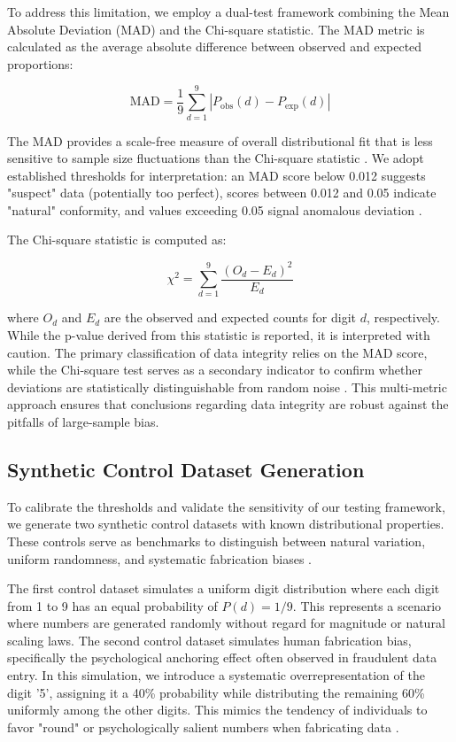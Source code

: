 \documentclass[11pt,a4paper]{article}
\begin{document}
To address this limitation, we employ a dual-test framework combining the Mean Absolute Deviation (MAD) and the Chi-square statistic. The MAD metric is calculated as the average absolute difference between observed and expected proportions:

$$ \text{MAD} = \frac{1}{9} \sum_{d=1}^{9} |P_{\text{obs}}(d) - P_{\text{exp}}(d)| $$

The MAD provides a scale-free measure of overall distributional fit that is less sensitive to sample size fluctuations than the Chi-square statistic \cite{Azevedo2021ABL}. We adopt established thresholds for interpretation: an MAD score below 0.012 suggests "suspect" data (potentially too perfect), scores between 0.012 and 0.05 indicate "natural" conformity, and values exceeding 0.05 signal anomalous deviation \cite{Kossler2024SomeNI}.

The Chi-square statistic is computed as:

$$ \chi^2 = \sum_{d=1}^{9} \frac{(O_d - E_d)^2}{E_d} $$

where $O_d$ and $E_d$ are the observed and expected counts for digit $d$, respectively. While the p-value derived from this statistic is reported, it is interpreted with caution. The primary classification of data integrity relies on the MAD score, while the Chi-square test serves as a secondary indicator to confirm whether deviations are statistically distinguishable from random noise \cite{Druica2018BenfordsLA}. This multi-metric approach ensures that conclusions regarding data integrity are robust against the pitfalls of large-sample bias.

\subsection{Synthetic Control Dataset Generation}
To calibrate the thresholds and validate the sensitivity of our testing framework, we generate two synthetic control datasets with known distributional properties. These controls serve as benchmarks to distinguish between natural variation, uniform randomness, and systematic fabrication biases \cite{Silva2024ANA}.

The first control dataset simulates a uniform digit distribution where each digit from 1 to 9 has an equal probability of $P(d) = 1/9$. This represents a scenario where numbers are generated randomly without regard for magnitude or natural scaling laws. The second control dataset simulates human fabrication bias, specifically the psychological anchoring effect often observed in fraudulent data entry. In this simulation, we introduce a systematic overrepresentation of the digit '5', assigning it a 40\% probability while distributing the remaining 60\% uniformly among the other digits. This mimics the tendency of individuals to favor "round" or psychologically salient numbers when fabricating data \cite{Josic2020TheAO}.
\end{document}

